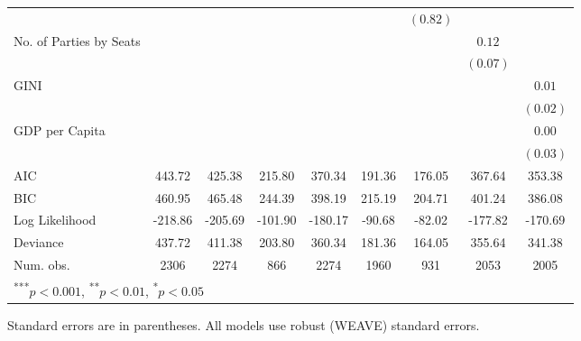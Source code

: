 \documentclass[a4paper]{article}\usepackage[]{graphicx}\usepackage[]{color}
\begin{document}
\begin{table}
\begin{center}
{\begin{tabular}{l c c c c c c c c }
                        &               &               &               &              &              & $(0.82)$     &               &              \\
No. of Parties by Seats &               &               &               &              &              &              & $0.12$        &              \\
                        &               &               &               &              &              &              & $(0.07)$      &              \\
GINI                    &               &               &               &              &              &              &               & $0.01$       \\
                        &               &               &               &              &              &              &               & $(0.02)$     \\
GDP per Capita          &               &               &               &              &              &              &               & $0.00$       \\
                        &               &               &               &              &              &              &               & $(0.03)$     \\
\hline
AIC                     & 443.72        & 425.38        & 215.80        & 370.34       & 191.36       & 176.05       & 367.64        & 353.38       \\
BIC                     & 460.95        & 465.48        & 244.39        & 398.19       & 215.19       & 204.71       & 401.24        & 386.08       \\
Log Likelihood          & -218.86       & -205.69       & -101.90       & -180.17      & -90.68       & -82.02       & -177.82       & -170.69      \\
Deviance                & 437.72        & 411.38        & 203.80        & 360.34       & 181.36       & 164.05       & 355.64        & 341.38       \\
Num. obs.               & 2306          & 2274          & 866           & 2274         & 1960         & 931          & 2053          & 2005         \\
\hline
\multicolumn{9}{l}{\scriptsize{\textsuperscript{***}$p<0.001$, 
  \textsuperscript{**}$p<0.01$, 
  \textsuperscript{*}$p<0.05$}}
\end{tabular}


}
\end{center}
{\scriptsize{
    Standard errors are in parentheses. All models use robust (WEAVE) standard errors. \\
}}
\end{table}
\end{document}

